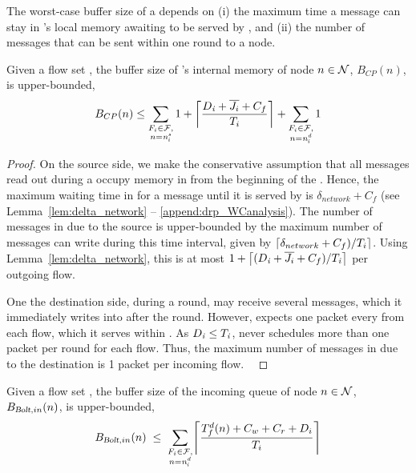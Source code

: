 The worst-case buffer size of a \cp depends on (i) the maximum time a message can stay in \cp's local memory awaiting to be served by \blink, and (ii) the number of messages that can be sent within one round to a node.

\begin{lemma} \label{lem:buffer_CP}
Given a flow set \flowset, the buffer size of {\cp}'s internal memory of node $n \in \nodeset$, $B_{CP}(n)$, is upper-bounded,
\begin{equation}
\label{eq:CP_memory_stress}
	B_{CP}(n) \leq
	\sum_{\substack{F_i\in \mathcal{F},\\ n = \flowsrci}}
	1 + \ceil*{\frac{\ndeadlinei + \overline{\jitteri} + C_f}{T_i}} +
	\sum_{\substack{F_i\in \mathcal{F},\\ n = \flowdsti}} 1
\end{equation}
\end{lemma}

\begin{proof}%
On the source side, we make the conservative assumption that all messages read out during a \emph{\opflush} occupy memory in \cpsrc from the beginning of the \emph{\opflush}. Hence, the maximum waiting time in \cpsrc for a message until it is served by \blink is $\delta_{network} + C_f$ (see Lemma~\ref{lem:delta_network} -- \cref{append:drp_WCanalysis}). The number of messages in \cpsrc due to the source is upper-bounded by the maximum number of messages \apsrc can write during this time interval, given by
$\ceil*{\delta_{network} + C_f)/T_i}$.
Using Lemma~\ref{lem:delta_network}, this is at most
$1 + \ceil*{( \ndeadlinei + \overline{\jitteri} + C_f)/\periodi }$  per outgoing flow.



One the destination side, during a round, \cpdst may receive several messages, which it immediately writes into \bolt after the round.
However, \blink expects one packet every \periodi from each flow, which it serves within \ndeadlinei. As $\ndeadlinei \leq \periodi$, \blink never schedules more than one packet per round for each flow.
Thus, the maximum number of messages in \cpdst due to the destination is 1 packet per incoming flow.
\
\end{proof}

\begin{lemma} \label{lem:buffer_bolt_in}
Given a flow set \flowset, the buffer size of the incoming \bolt queue of node $n \in \nodeset$, $B_{\bolt,in}(n)$, is upper-bounded,
\begin{equation}
\label{eq:bolt_in_buffer_stress}
	B_{\bolt, in}(n)\;  \leq \;
	\sum_{\substack{F_i\in \mathcal{F},\\ n = \flowdsti}} \ceil*{\frac{T_f^d(n) + C_w + C_r + D_i}{T_i}}
\end{equation}
\end{lemma}

